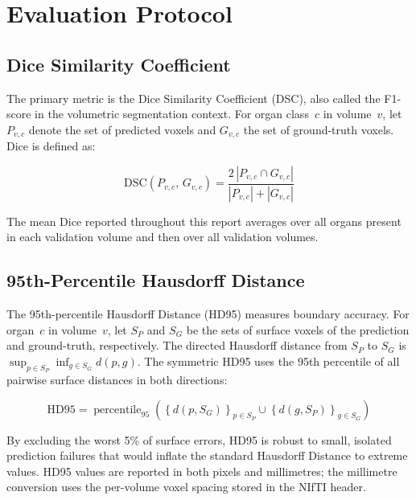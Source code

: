 \chapter{Evaluation Protocol}
\label{chap:eval}

\section{Dice Similarity Coefficient}

The primary metric is the Dice Similarity Coefficient (DSC), also called the F1-score in the
volumetric segmentation context. For organ class~$c$ in volume~$v$, let $P_{v,c}$ denote the
set of predicted voxels and $G_{v,c}$ the set of ground-truth voxels. Dice is defined as:

\begin{equation}
  \mathrm{DSC}(P_{v,c},\, G_{v,c}) = \frac{2\,|P_{v,c} \cap G_{v,c}|}{|P_{v,c}| + |G_{v,c}|}
  \label{eq:dice}
\end{equation}

The mean Dice reported throughout this report averages over all organs present in each
validation volume and then over all validation volumes.

\section{95th-Percentile Hausdorff Distance}

The 95th-percentile Hausdorff Distance (HD95) measures boundary accuracy. For organ~$c$ in
volume~$v$, let $S_P$ and $S_G$ be the sets of surface voxels of the prediction and
ground-truth, respectively. The directed Hausdorff distance from $S_P$ to $S_G$ is
$\sup_{p \in S_P} \inf_{g \in S_G} d(p, g)$. The symmetric HD95 uses the 95th percentile of
all pairwise surface distances in both directions:

\begin{equation}
  \mathrm{HD95} = \operatorname{percentile}_{95}\!\left(
    \left\{d(p, S_G)\right\}_{p \in S_P} \cup
    \left\{d(g, S_P)\right\}_{g \in S_G}
  \right)
\end{equation}

By excluding the worst 5\% of surface errors, HD95 is robust to small, isolated prediction
failures that would inflate the standard Hausdorff Distance to extreme values. HD95 values
are reported in both pixels and millimetres; the millimetre conversion uses the per-volume
voxel spacing stored in the NIfTI header.

